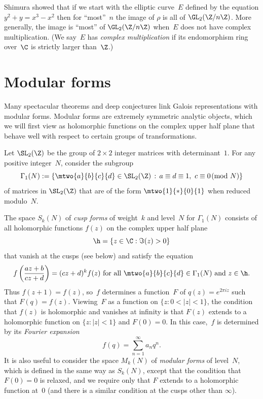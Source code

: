 \documentclass{report}
\begin{document}
Shimura showed
that if we start with the elliptic curve~$E$
defined by the equation $y^2+y = x^3-x^2$
then for ``most''~$n$ the image of $\rho$ is all of $\GL_2(\Z/n\Z)$.
More generally, the image is ``most'' of $\GL_2(\Z/n\Z)$ when~$E$
does not have complex multiplication.  (We say~$E$ has
{\em complex multiplication} if its endomorphism ring over~$\C$
is strictly larger than~$\Z$.)

\section{Modular forms}\label{sec:modformintro}
Many spectacular theorems and deep conjectures link Galois
representations with modular forms.  Modular forms are extremely
symmetric analytic objects, which we will first view as holomorphic
functions on the complex upper half plane that behave well with
respect to certain groups of transformations.

Let $\SL_2(\Z)$ be the group of $2\times 2$ integer matrices
with determinant~$1$.
For any positive integer~$N$, consider the subgroup
$$\Gamma_1(N):=\left\{
\mtwo{a}{b}{c}{d}
 \in \SL_2(\Z) \, :\,
a\equiv d\equiv 1,\,\, c\equiv 0 \!\!\pmod{N}  \right\}
$$
of matrices in $\SL_2(\Z)$ that are of the form
$\mtwo{1}{*}{0}{1}$ when reduced modulo~$N$.

The space $S_k(N)$ of {\em cusp forms} of weight~$k$ and
level~$N$ for $\Gamma_1(N)$ consists of
all holomorphic functions $f(z)$ on the complex upper half plane
$$
  \h=\{z\in\C : \Im(z)>0\}
$$
that vanish at the cusps (see below) and satisfy the equation
\begin{equation*}
f\left(\frac{az+b}{cz+d}\right)=(cz+d)^k f(z) \text{ for all }
\mtwo{a}{b}{c}{d}
\in \Gamma_1(N)\text{ and }z \in \h.
\end{equation*}
Thus $f(z+1)=f(z)$, so~$f$ determines
a function~$F$ of $q(z)=e^{2\pi i z}$ such that $F(q)=f(z)$.
Viewing~$F$ as a function on $\{z:0<|z|<1\}$, the condition that $f(z)$
is holomorphic and
vanishes at infinity is that $F(z)$ extends to a holomorphic
function on $\{z:|z|<1\}$ and $F(0)=0$.
In this case,~$f$ is determined by its {\em Fourier expansion}
$$
  f(q)=\sum_{n=1}^{\infty}a_n q^n.
$$
It is also useful to consider the space $M_k(N)$
of {\em modular forms} of level~$N$, which is defined in the
same way as $S_k(N)$, except that the condition that $F(0)=0$
is relaxed, and we require only that $F$ extends to a holomorphic
function at~$0$ (and there is a similar condition at the
cusps other than $\infty$).
\end{document}

